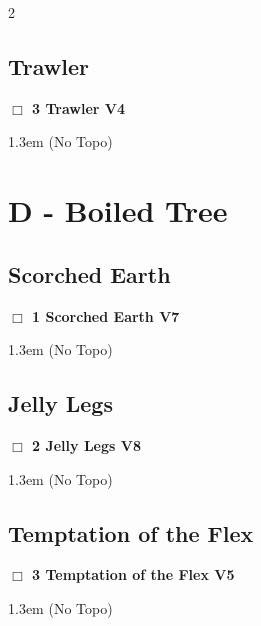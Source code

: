 \begin{multicols}{2}
\subsection*{Trawler}\label{bf:Trawler}
\needspace{2em}
\label{rt:Trawler}
\colorbox{RoyalBlue!20}{
\parbox{0.95\linewidth}{
\hspace{-1ex}\textbf{$\Box$
3 Trawler V4  
}}}
\begin{adjustwidth}{1.3em}{}			
  (No Topo)
\end{adjustwidth}
\newpage
\section{D - Boiled Tree}\label{sa:Boiled Tree}
\needspace{10em}
\subsection*{Scorched Earth}\label{bf:Scorched Earth}
\needspace{2em}
\label{rt:Scorched Earth}
\colorbox{Goldenrod!50}{
\parbox{0.95\linewidth}{
\hspace{-1ex}\textbf{$\Box$
1 Scorched Earth V7  
}}}
\begin{adjustwidth}{1.3em}{}			
  (No Topo)
\end{adjustwidth}
\needspace{10em}
\subsection*{Jelly Legs}\label{bf:Jelly Legs}
\needspace{2em}
\label{rt:Jelly Legs}
\colorbox{Goldenrod!50}{
\parbox{0.95\linewidth}{
\hspace{-1ex}\textbf{$\Box$
2 Jelly Legs V8  
}}}
\begin{adjustwidth}{1.3em}{}			
  (No Topo)
\end{adjustwidth}
\needspace{10em}
\subsection*{Temptation of the Flex}\label{bf:Temptation of the Flex}
\needspace{2em}
\label{rt:Temptation of the Flex}
\colorbox{RoyalBlue!20}{
\parbox{0.95\linewidth}{
\hspace{-1ex}\textbf{$\Box$
3 Temptation of the Flex V5  
}}}
\begin{adjustwidth}{1.3em}{}			
  (No Topo)
\end{adjustwidth}
\needspace{10em}

\end{multicols}
